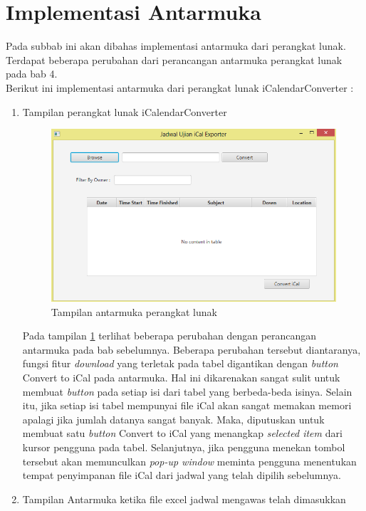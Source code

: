 \section{Implementasi Antarmuka}
Pada subbab ini akan dibahas implementasi antarmuka dari perangkat lunak. Terdapat beberapa perubahan dari perancangan antarmuka perangkat lunak pada bab 4.\\ 
Berikut ini implementasi antarmuka dari perangkat lunak iCalendarConverter :
\begin{enumerate}
	\item Tampilan perangkat lunak iCalendarConverter
		\begin{figure}[H]
		\centering
		\includegraphics[scale=0.7]{Gambar/implementAntarmuka}
		\caption{Tampilan antarmuka perangkat lunak}
		\label{fig:implementAntarmuka}
		\end{figure}
		Pada tampilan \ref{fig:implementAntarmuka} terlihat beberapa perubahan dengan perancangan antarmuka pada bab sebelumnya. Beberapa perubahan tersebut diantaranya, fungsi fitur \textit{download} yang terletak pada tabel digantikan dengan \textit{button} Convert to iCal pada antarmuka. Hal ini dikarenakan sangat sulit untuk membuat \textit{button} pada setiap isi dari tabel yang berbeda-beda isinya. Selain itu, jika setiap isi tabel mempunyai file iCal akan sangat memakan memori apalagi jika jumlah datanya sangat banyak. Maka, diputuskan untuk membuat satu \textit{button} Convert to iCal yang menangkap \textit{selected item} dari kursor pengguna pada tabel. Selanjutnya, jika pengguna menekan tombol tersebut akan memunculkan \textit{pop-up window} meminta pengguna menentukan tempat penyimpanan file iCal dari jadwal yang telah dipilih sebelumnya.     
	\item Tampilan Antarmuka ketika file excel jadwal mengawas telah dimasukkan

\end{enumerate}
